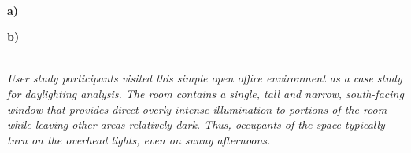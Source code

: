 \documentclass[landscape,20pt]{sciposter}
\begin{document}
\begin{minipage}[b]{12.65in}
\vspace{-0.5in} \ 
\begin{minipage}{5.5in}\textcolor[rgb]{1,1,1}{\hspace{0.03in} {\bf a)}} \end{minipage}
\begin{minipage}{7in}\textcolor[rgb]{1,1,1}{\hspace{0.03in} {\bf b)}} \end{minipage}
\vspace{0.25in} \\ {\em User study participants visited this simple open office
  environment as a case study for daylighting analysis.  The room
  contains a single, tall and narrow, south-facing window that
  provides direct overly-intense illumination to portions of the room
  while leaving other areas relatively dark.  Thus, occupants of the
  space typically turn on the overhead lights, even on sunny
  afternoons. }
\end{minipage}

\vspace{0.1in}

\end{document}
